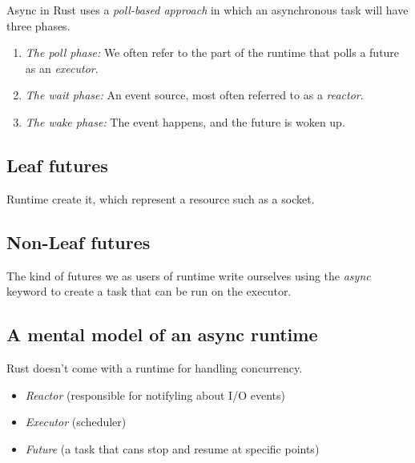 Async in Rust uses a \emph{poll-based approach} in which an asynchronous task will
have three phases.
\begin{enumerate}
	\item \emph{The poll phase:}
		  We often refer to the part of the runtime that polls a future as an \emph{executor}.
	\item \emph{The wait phase:}
		  An event source, most often referred to as a \emph{reactor}.
	\item \emph{The wake phase:}
		  The event happens, and the future is woken up.
\end{enumerate}

\subsection{Leaf futures}
\begin{definition}
	Runtime create it, which represent a resource such as a socket.
\end{definition}

\subsection{Non-Leaf futures}
\begin{definition}
	The kind of futures we as users of runtime write ourselves using the \emph{async}
	keyword to create a task that can be run on the executor.
\end{definition}

\subsection{A mental model of an async runtime}
Rust doesn't come with a runtime for handling concurrency.
\begin{itemize}
	\item  \emph{Reactor} (responsible for notifyling about I/O events)
	\item  \emph{Executor} (scheduler)
	\item  \emph{Future} (a task that cans stop and resume at specific points)
\end{itemize}

